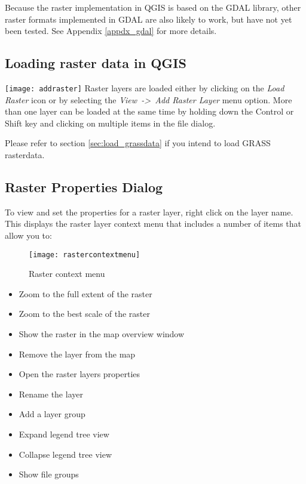 Because the raster implementation in QGIS is based on the GDAL library, other
raster formats implemented in GDAL are also likely to work, but have not yet
been tested. See Appendix \ref{appdx_gdal} for more
details.
	
\subsection{Loading raster data in QGIS}\label{label_loadraster}

\texttt{[image: addraster]} Raster layers
are loaded either by clicking on the \textsl{Load Raster} icon or by
selecting the \textsl{View~->~Add Raster Layer} menu option. More than one 
layer can be loaded at the same time by holding down the Control or Shift key
and clicking on multiple items in the file dialog.

Please refer to section \ref{sec:load_grassdata} if you intend to load GRASS rasterdata.
	
\subsection{Raster Properties Dialog}\label{label_rasterprop}

To view and set the properties for a raster layer, right click on the layer
name. This displays the raster layer context menu that includes a number of
items that allow you to:

\begin{figure}[ht]
   \begin{center}
   \caption{Raster context menu}\label{fig:raster_contextmenu}\smallskip
   \texttt{[image: rastercontextmenu]}
\end{center}  
\end{figure}

\begin{itemize}
\item Zoom to the full extent of the raster
\item Zoom to the best scale of the raster
\item Show the raster in the map overview window
\item Remove the layer from the map
\item Open the raster layers properties
\item Rename the layer
\item Add a layer group
\item Expand legend tree view
\item Collapse legend tree view
\item Show file groups
\end{itemize}

